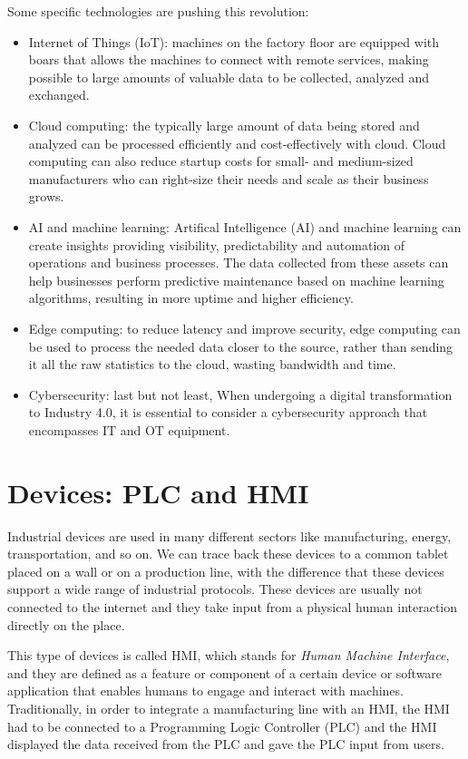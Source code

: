 Some specific technologies are pushing this revolution:~\cite{what-is-industry-4-0}
\begin{itemize}
  \item Internet of Things (IoT): machines on the factory floor are equipped with boars that allows the machines to connect with remote services, making possible to large amounts of valuable data to be collected, analyzed and exchanged.
  \item Cloud computing: the typically large amount of data being stored and analyzed can be processed efficiently and cost-effectively with cloud. Cloud computing can also reduce startup costs for small- and medium-sized manufacturers who can right-size their needs and scale as their business grows.
  \item AI and machine learning: Artifical Intelligence (AI) and machine learning can create insights providing visibility, predictability and automation of operations and business processes. The data collected from these assets can help businesses perform predictive maintenance based on machine learning algorithms, resulting in more uptime and higher efficiency.
  \item Edge computing: to reduce latency and improve security, edge computing can be used to process the needed data closer to the source, rather than sending it all the raw statistics to the cloud, wasting bandwidth and time.
  \item Cybersecurity: last but not least, When undergoing a digital transformation to Industry 4.0, it is essential to consider a cybersecurity approach that encompasses IT and OT equipment.
\end{itemize}

\section{Devices: PLC and HMI}

Industrial devices are used in many different sectors like manufacturing, energy, transportation, and so on. We can trace back these devices to a common tablet placed on a wall or on a production line, with the difference that these devices support a wide range of industrial protocols. These devices are usually not connected to the internet and they take input from a physical human interaction directly on the place. 

This type of devices is called HMI, which stands for \textit{Human Machine Interface}, and they are defined as a feature or component of a certain device or software application that enables humans to engage and interact with machines.\\
Traditionally, in order to integrate a manufacturing line with an HMI, the HMI had to be connected to a Programming Logic Controller (PLC) and the HMI displayed the data received from the PLC and gave the PLC input from users.~\cite{what-is-hmi}

